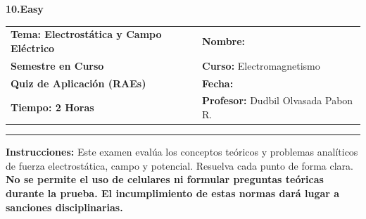 \documentclass[10pt,twoside]{article}
\newcounter{problema}
\newcommand{\class}{\textcolor{eTenPrimary}{Tema: Electrostática y Campo Eléctrico}}
\newcommand{\term}{Semestre en Curso}
\newcommand{\examnum}{Quiz de Aplicación (RAEs)}
\newcommand{\timelimit}{2 Horas}
\begin{document}
\noindent
\begin{minipage}[c]{0.12\textwidth}
    {\Large\bfseries\color{eTenPrimary} 10.Easy}
\end{minipage}%
\hspace{0.03\textwidth}%
\begin{minipage}[c]{0.85\textwidth}
\begin{tabular}{@{}p{} p{}@{}}
\textbf{\class} & \textbf{Nombre:} \hrulefill \\
\textbf{\term} & \textbf{Curso:} Electromagnetismo \\
\textbf{\examnum} & \textbf{Fecha:} \hrulefill \\
\textbf{Tiempo: \timelimit} & \textbf{Profesor:} Dudbil Olvasada Pabon R.
\end{tabular}
\end{minipage}
\vspace{0.1cm}
\rule[2ex]{\textwidth}{1pt}

\vspace{0.1cm}
\noindent
\textbf{Instrucciones:} Este examen evalúa los conceptos teóricos y problemas analíticos de fuerza electrostática, campo y potencial. Resuelva cada punto de forma clara. \textbf{No se permite el uso de celulares ni formular preguntas teóricas durante la prueba. El incumplimiento de estas normas dará lugar a sanciones disciplinarias.}
\end{document}
